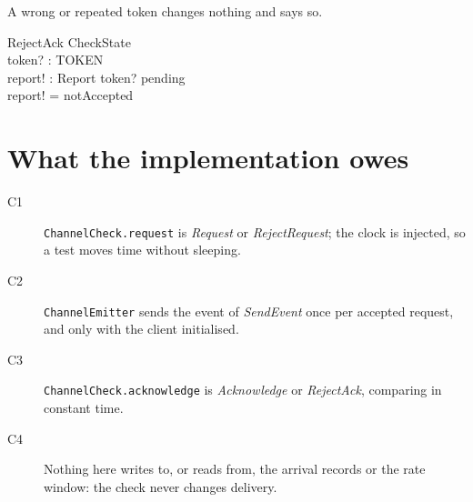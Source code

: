 \documentclass[a4paper,10pt,fleqn]{article}
\begin{document}
A wrong or repeated token changes nothing and says so.

\begin{schema}{RejectAck}
  \Xi CheckState \\
  token? : TOKEN \\
  report! : Report
\where
  token? \notin pending \\
  report! = notAccepted
\end{schema}

\section{What the implementation owes}

\begin{description}
\item[C1] \texttt{ChannelCheck.request} is \emph{Request} or
  \emph{RejectRequest}; the clock is injected, so a test moves time without
  sleeping.
\item[C2] \texttt{ChannelEmitter} sends the event of \emph{SendEvent} once per
  accepted request, and only with the client initialised.
\item[C3] \texttt{ChannelCheck.acknowledge} is \emph{Acknowledge} or
  \emph{RejectAck}, comparing in constant time.
\item[C4] Nothing here writes to, or reads from, the arrival records or the
  rate window: the check never changes delivery.
\end{description}
\end{document}
